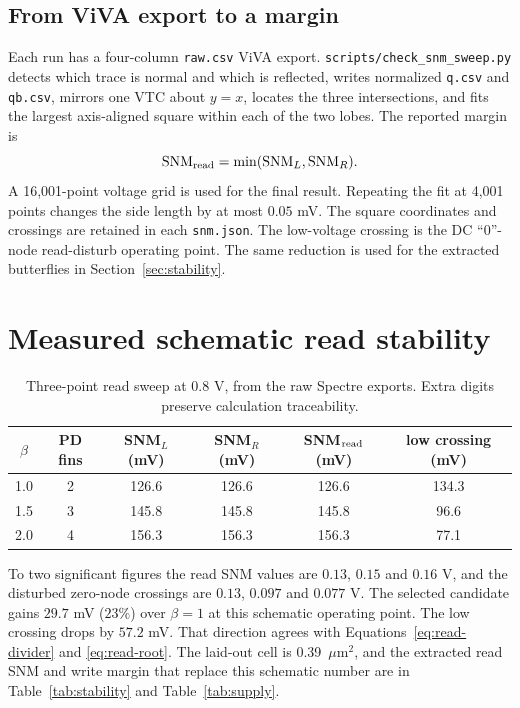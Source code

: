 \documentclass[10pt,letterpaper]{article}
\newcommand{\sourcepath}[1]{\nolinkurl{#1}}
\newcommand{\cellAreaUm}{0.39}      %
\begin{document}
\subsection{From ViVA export to a margin}
Each run has a four-column \sourcepath{raw.csv} ViVA export. \sourcepath{scripts/check_snm_sweep.py} detects which trace is normal and which is reflected, writes normalized \sourcepath{q.csv} and \sourcepath{qb.csv}, mirrors one VTC about $y=x$, locates the three intersections, and fits the largest axis-aligned square within each of the two lobes. The reported margin is
\begin{equation}
\mathrm{SNM}_{\rm read}=\min(\mathrm{SNM}_{L},\mathrm{SNM}_{R}).
\end{equation}
A 16,001-point voltage grid is used for the final result. Repeating the fit at 4,001 points changes the side length by at most $0.05$ mV. The square coordinates and crossings are retained in each \sourcepath{snm.json}. The low-voltage crossing is the DC ``0''-node read-disturb operating point. The same reduction is used for the extracted butterflies in Section~\ref{sec:stability}.

\section{Measured schematic read stability}
\begin{table}[H]\centering
\caption{Three-point read sweep at $0.8$ V, from the raw Spectre exports. Extra digits preserve calculation traceability.}\label{tab:sweep}
\begin{tabular}{@{}cccccc@{}}\toprule
$\beta$ & PD fins & SNM$_L$ (mV) & SNM$_R$ (mV) & SNM$_{\rm read}$ (mV) & low crossing (mV) \\\midrule
1.0 & 2 & 126.6 & 126.6 & 126.6 & 134.3 \\
1.5 & 3 & 145.8 & 145.8 & 145.8 & 96.6 \\
2.0 & 4 & 156.3 & 156.3 & 156.3 & 77.1 \\\bottomrule
\end{tabular}
\end{table}
To two significant figures the read SNM values are $0.13$, $0.15$ and $0.16$ V, and the disturbed zero-node crossings are $0.13$, $0.097$ and $0.077$ V.
The selected candidate gains $29.7$ mV ($23\%$) over $\beta=1$ at this schematic operating point. The low crossing drops by $57.2$ mV. That direction agrees with Equations~\eqref{eq:read-divider} and \eqref{eq:read-root}. The laid-out cell is \cellAreaUm\ $\mu$m$^2$, and the extracted read SNM and write margin that replace this schematic number are in Table~\ref{tab:stability} and Table~\ref{tab:supply}.
\end{document}
